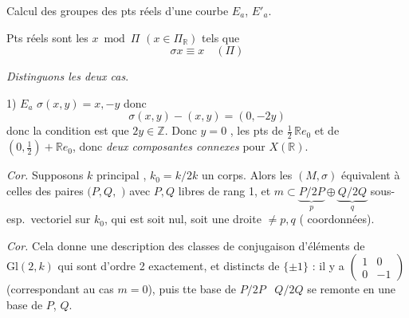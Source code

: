 \documentclass[11pt,a4paper]{article}
\begin{document}
Calcul des groupes des pts réels d'une courbe $E_{a}$, $E'_{a}$.

Pts réels sont les $x \bmod \Pi$ $(x \in \Pi_{\mathbb{R}})$ tels que
\[
  \sigma x \equiv x \quad (\Pi)
\]

\emph{Distinguons les deux cas}.

1) \emph{$E_{a}$}  $\sigma(x, y) = x, -y$
donc
\[
  \sigma(x, y) - (x, y) = (0, -2y)
\]
donc la condition est que $2y \in \mathbb{Z}$. Donc $y = 0$ 
, les pts de
 $\tfrac{1}{2}\, \mathbb{R} e_{0}$ et de
\struck{\ill{}} $(0, \tfrac{1}{2}) + \mathbb{R} e_{0}$, donc \emph{deux
composantes connexes} pour $X(\mathbb{R})$.

\emph{Cor.} Supposons $k$ principal , $k_{0} = k/2k$ un corps.
Alors les  $(M, \sigma)$
 équivalent à celles des paires
$(P, Q,$ \struck{\ill{}}$)$ avec $P, Q$ libres de rang 1, et
 $m \subset \underbrace{P/2P}_{p} \oplus
\underbrace{Q/2Q}_{q}$ sous-esp.\ vectoriel sur $k_{0}$, \struck{\ill{}}
qui est soit nul, soit une droite $\neq p, q$ (
coordonnées).

\emph{Cor.} Cela donne une description des classes de conjugaison
d'éléments de $\mathrm{Gl}(2, k)$ \struck{$*$} qui sont d'ordre 2 exactement,
 et distincts de $\{\pm 1\}$ : il y \struck{\ill{}} a
$\begin{pmatrix} 1 & 0 \\ 0 & -1 \end{pmatrix}$ (correspondant au cas
$m = 0$), puis  
 tte base de $P/2P$ \ $Q/2Q$ se remonte en une base de $P$, $Q$.
\end{document}
